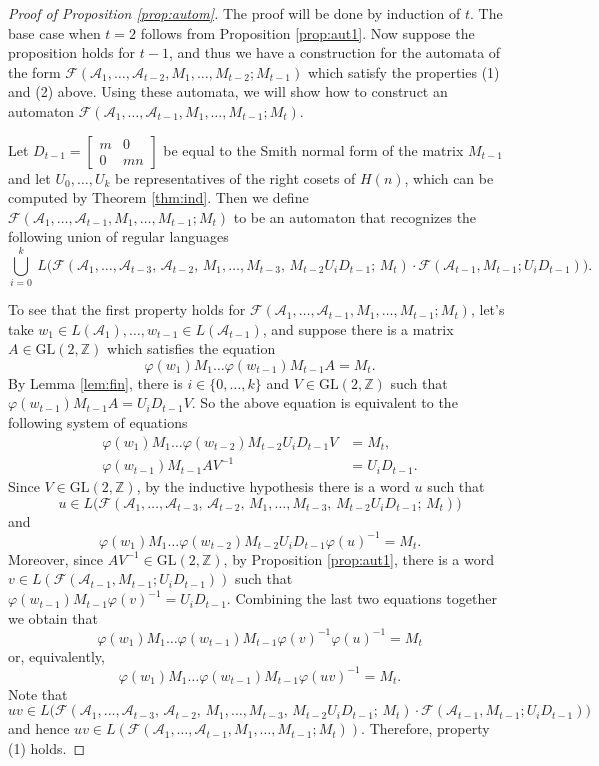 \documentclass[fontsize=11pt,DIV=13,paper=letter]{scrartcl}
\theoremstyle{definition}
\newcommand{\A}{\mathcal{A}}
\newcommand{\Z}{\mathbb{Z}}
\newcommand{\F}{\mathcal{F}}
\newcommand{\GL}{\mathrm{GL}(2,\Z)}
\renewcommand{\phi}{\varphi}
\begin{document}
\begin{proof}[Proof of Proposition \ref{prop:autom}]
The proof will be done by induction of $t$. The base case when $t=2$ follows from Proposition \ref{prop:aut1}. Now suppose the proposition holds for $t-1$, and thus we have a construction for the automata of the form $\F(\A_1,\dots,\A_{t-2},M_1,\dots,M_{t-2};M_{t-1})$ which satisfy the properties (1) and (2) above. Using these automata, we will show how to construct an automaton $\F(\A_1,\dots,\A_{t-1},M_1,\dots,M_{t-1};M_t)$.

Let $D_{t-1}=\begin{bmatrix} m & 0\\ 0 & mn \end{bmatrix}$ be equal to the Smith normal form of the matrix $M_{t-1}$ and let $U_0,\dots,U_k$ be representatives of the right cosets of $H(n)$, which can be computed by Theorem \ref{thm:ind}.
Then we define $\F(\A_1,\dots,\A_{t-1},M_1,\dots,M_{t-1};M_t)$ to be an automaton that recognizes the following union of regular languages
\[
\bigcup_{i=0}^k\ L\Big(\F(\A_1,\dots,\A_{t-3},\,\A_{t-2},\,M_1,\dots,M_{t-3},\,M_{t-2}U_iD_{t-1};\,M_t)\cdot \F(\A_{t-1},M_{t-1};U_iD_{t-1})\Big).
\]

To see that the first property holds for $\F(\A_1,\dots,\A_{t-1},M_1,\dots,M_{t-1};M_t)$, let's take $w_1\in L(\A_1),\dots,w_{t-1}\in L(\A_{t-1})$, and suppose there is a matrix $A\in \GL$ which satisfies the equation
\[
\phi(w_1)M_1\dots\phi(w_{t-1})M_{t-1}A=M_t.
\]
By Lemma \ref{lem:fin}, there is $i\in \{0,\dots,k\}$ and $V\in \GL$ such that $\phi(w_{t-1})M_{t-1}A=U_iD_{t-1}V$. So the above equation is equivalent to the following system of equations
\[
\begin{split}
\phi(w_1)M_1\dots\phi(w_{t-2})M_{t-2}U_iD_{t-1}V &=M_t,\\
\phi(w_{t-1})M_{t-1}AV^{-1} &=U_iD_{t-1}.
\end{split}
\]
Since $V\in \GL$, by the inductive hypothesis there is a word $u$ such that
\[
u\in L\Big(\F(\A_1,\dots,\A_{t-3},\,\A_{t-2},\,M_1,\dots,M_{t-3},\,M_{t-2}U_iD_{t-1};\,M_t)\Big)
\]
and
\[
\phi(w_1)M_1\dots\phi(w_{t-2})M_{t-2}U_iD_{t-1}\phi(u)^{-1} =M_t.
\]
Moreover, since $AV^{-1}\in \GL$, by Proposition \ref{prop:aut1}, there is a word $v\in L(\F(\A_{t-1},M_{t-1};U_iD_{t-1}))$ such that $\phi(w_{t-1})M_{t-1}\phi(v)^{-1} =U_iD_{t-1}$. Combining the last two equations together we obtain that
\[
\phi(w_1)M_1\dots\phi(w_{t-1})M_{t-1}\phi(v)^{-1}\phi(u)^{-1}=M_t
\]
or, equivalently,
\[
\phi(w_1)M_1\dots\phi(w_{t-1})M_{t-1}\phi(uv)^{-1}=M_t.
\]
Note that
\[
uv\in L\Big(\F(\A_1,\dots,\A_{t-3},\,\A_{t-2},\,M_1,\dots,M_{t-3},\,M_{t-2}U_iD_{t-1};\,M_t)\cdot \F(\A_{t-1},M_{t-1};U_iD_{t-1})\Big)
\]
and hence $uv\in L(\F(\A_1,\dots,\A_{t-1},M_1,\dots,M_{t-1};M_t))$. Therefore, property (1) holds.


\end{proof}
\end{document}
